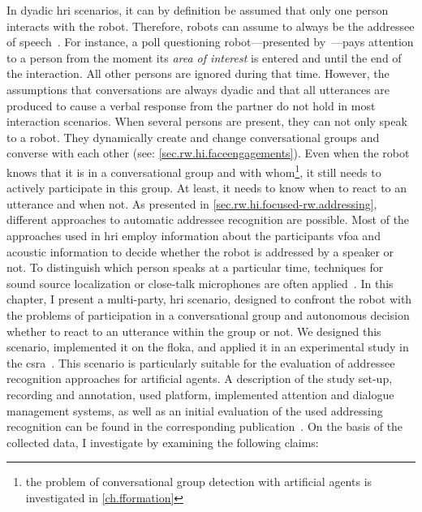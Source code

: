 In dyadic \gls{hri} scenarios, it can by definition be assumed that only one person interacts with the \gls{robot}.
Therefore, \glspl{robot} can assume to always be the \gls{addressee} of speech~\cite{Holthaus,Carlmeyer2014,Huang2016}.
For instance, a poll questioning \gls{robot}---presented by~---pays attention to a person from the moment its \emph{area of interest} is entered and until the end of the interaction.
All other persons are ignored during that time.
However, the assumptions that \glspl{conversation} are always dyadic and that all utterances are produced to cause a verbal response from the  partner do not hold in most interaction scenarios.
When several persons are present, they can not only speak to a \gls{robot}.
They dynamically create and change \glspl{conversational group} and converse with each other (see: \cref{sec.rw.hi.faceengagements}).
Even when the \gls{robot} knows that it is in a \gls{conversational group} and with whom\footnote{the problem of {conversational group} detection with \glspl{artificial agent} is investigated in \cref{ch.fformation}}, it still needs to actively participate in this group.
At least, it needs to know when to react to an utterance and when not.
As presented in \cref{sec.rw.hi.focused-rw.addressing}, different approaches to automatic \gls{addressee} recognition are possible.
Most of the approaches used in \gls{hri} employ information about the participants \gls{vfoa} and acoustic information to decide whether the \gls{robot} is addressed by a \gls{speaker} or not.
To distinguish which person speaks at a particular time, techniques for sound source localization or close-talk microphones are often applied~\cite{Lang2003,Skantze2014}.
In this chapter, I present a multi-party, \acrlong{hri} scenario, designed to confront the \gls{robot} with the problems of participation in a \gls{conversational group} and autonomous decision whether to react to an utterance within the group or not.
We designed this scenario, implemented it on the \gls{floka}, and applied it in an experimental study in the \gls{csra}~\cite{Richter}.
This scenario is particularly suitable for the evaluation of \gls{addressee} recognition approaches for \glspl{artificial agent}.
A description of the study set-up, recording and annotation, used platform, implemented attention and dialogue management systems, as well as an initial evaluation of the used addressing recognition can be found in the corresponding publication~\cite{Richter}.
On the basis of the collected data, I investigate  by examining the following claims: 
